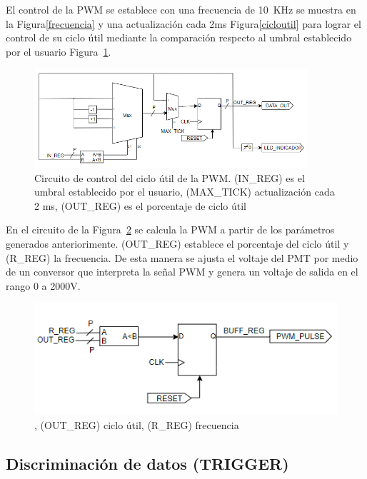 El control de la PWM se establece con una frecuencia de 10~KHz se muestra en la Figura\ref{frecuencia} y una actualización cada 2ms Figura\ref{cicloutil} para lograr el control de su ciclo útil mediante la comparación respecto al umbral establecido por el usuario Figura~\ref{pwm}.
\begin{figure}[h]
\includegraphics[width=0.9\textwidth]{Figs/RAMPA33.PNG} 
\centering
\caption[Circuito de control del ciclo útil de la PWM]{Circuito de control del ciclo útil de la PWM. (IN\_REG) es el umbral establecido por el usuario, (MAX\_TICK) actualización cada 2 ms, (OUT\_REG) es el porcentaje de ciclo útil}
\label{pwm}
\end{figure}

En el circuito de la Figura~\ref{salida} se calcula la PWM a partir de los parámetros generados anteriorimente.
(OUT\_REG) establece el porcentaje del ciclo útil y (R\_REG) la frecuencia.
De esta manera se ajusta el voltaje del PMT por medio de un conversor que interpreta la señal PWM y genera un voltaje de salida en el rango 0 a 2000V.

\begin{figure}[h]
\includegraphics[scale=1]{Figs/RAMPA22.PNG} 
\centering
\caption[Circuito señal de control PWM]{, (OUT\_REG) ciclo útil, (R\_REG) frecuencia}
\label{salida}
\end{figure}


\subsection{Discriminación de datos (TRIGGER)}

